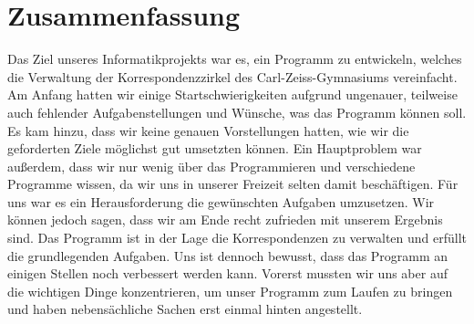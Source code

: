 \chapter{Zusammenfassung}
Das Ziel unseres Informatikprojekts war es, ein Programm zu entwickeln, welches die Verwaltung der Korrespondenzzirkel des Carl-Zeiss-Gymnasiums vereinfacht. Am Anfang hatten wir einige Startschwierigkeiten aufgrund ungenauer, teilweise auch fehlender Aufgabenstellungen und Wünsche, was das Programm können soll. Es kam hinzu, dass wir keine genauen Vorstellungen hatten, wie wir die geforderten Ziele möglichst gut umsetzten können. Ein Hauptproblem war außerdem, dass wir nur wenig über das Programmieren und verschiedene Programme wissen, da wir uns in unserer Freizeit selten damit beschäftigen. Für uns war es ein Herausforderung die gewünschten Aufgaben umzusetzen. Wir können jedoch sagen, dass wir am Ende recht zufrieden mit unserem Ergebnis sind. Das Programm ist in der Lage die Korrespondenzen zu verwalten und erfüllt die grundlegenden Aufgaben. Uns ist dennoch bewusst, dass das Programm an einigen Stellen noch verbessert werden kann. Vorerst mussten wir uns aber auf die wichtigen Dinge konzentrieren, um unser Programm zum Laufen zu bringen und haben nebensächliche Sachen erst einmal hinten angestellt. 